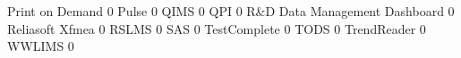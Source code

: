 \documentclass{article}
\begin{document}
\begin{Schunk}
\begin{Soutput}
  Print on Demand                                                         0
  Pulse                                                                   0
  QIMS                                                                    0
  QPI                                                                     0
  R&D Data Management Dashboard                                           0
  Reliasoft Xfmea                                                         0
  RSLMS                                                                   0
  SAS                                                                     0
  TestComplete                                                            0
  TODS                                                                    0
  TrendReader                                                             0
  WWLIMS                                                                  0
                                          

\end{Soutput}
\end{Schunk}
\end{document}
